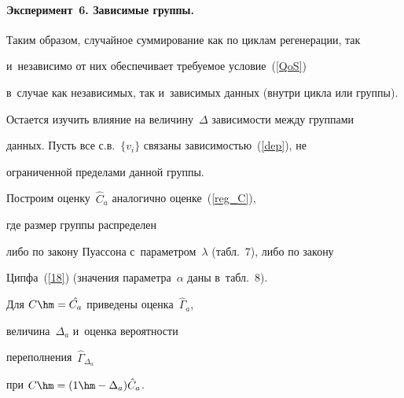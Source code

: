 \vspace*{-3pt}





\paragraph*{Эксперимент~6.  Зависимые группы.}


Таким образом, случайное суммирование как  по циклам регенерации, так 


и~независимо от них  обеспечивает  требуемое условие~(\ref{QoS})   


в~случае как независимых,  так  и~зависимых данных (внутри цикла или группы).





Остается изучить    влияние на величину~${\Delta}$  зависимости между группами 


данных. Пусть все  с.в.~$\{v_i\}$ связаны зависимостью~(\ref{dep}), не 


ограниченной  пределами данной  группы.


Построим оценку~${\hat C}_{a}$  аналогично оценке~(\ref{reg_C}),


где размер  группы распределен


 либо  по закону Пуассона с~параметром~$\lambda$ (табл.~7), либо по закону 


Ципфа~(\ref{18}) (значения параметра~$\alpha$ даны  в~табл.~8).


 Для $C\hm=\hat{C_{a}}$ приведены   оценка~${\hat\Gamma}_{a}$, 


 величина~${\Delta}_{a}$ и~оценка вероятности 


 переполнения~${\hat\Gamma}_{{\Delta}_{a}}$ 


при $C\hm= (1\hm-{\Delta}_{a}){\hat C}_{a}$.











